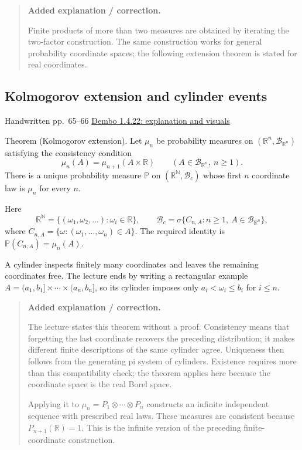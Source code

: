 \documentclass[11pt,letterpaper]{article}
\newcommand{\lecturesection}[1]{\subsection{#1}}
\begin{document}
\begin{quote}\small\textbf{Added explanation / correction.}

Finite products of more than two measures are obtained by iterating the two-factor construction. The same construction works for general probability coordinate spaces; the following extension theorem is stated for real coordinates.
\end{quote}

\hypertarget{l7-s13}{}
\lecturesection{Kolmogorov extension and cylinder events}
{\small\textcolor{lectureink}{Handwritten pp.\ 65--66} \quad \href{https://josephrbailey.com/probability/\#entry-1-4-22}{Dembo 1.4.22: explanation and visuals}}

Theorem (Kolmogorov extension). Let $\mu_n$ be probability measures on $(\mathbb R^n,\mathcal B_{\mathbb R^n})$ satisfying the consistency condition \[\mu_n(A)=\mu_{n+1}(A\times\mathbb R)\qquad(A\in\mathcal B_{\mathbb R^n},\ n\ge1).\] There is a unique probability measure $\mathbb P$ on $(\mathbb R^{\mathbb N},\mathcal B_c)$ whose first $n$ coordinate law is $\mu_n$ for every $n$.

Here \[\mathbb R^{\mathbb N}=\{(\omega_1,\omega_2,\ldots):\omega_i\in\mathbb R\},\qquad\mathcal B_c=\sigma\{C_{n,A}:n\ge1,\ A\in\mathcal B_{\mathbb R^n}\},\] where $C_{n,A}=\{\omega:(\omega_1,\ldots,\omega_n)\in A\}$. The required identity is $\mathbb P(C_{n,A})=\mu_n(A)$.

A cylinder inspects finitely many coordinates and leaves the remaining coordinates free. The lecture ends by writing a rectangular example $A=(a_1,b_1]\times\cdots\times(a_n,b_n]$, so its cylinder imposes only $a_i<\omega_i\le b_i$ for $i\le n$.

\begin{quote}\small\textbf{Added explanation / correction.}

The lecture states this theorem without a proof. Consistency means that forgetting the last coordinate recovers the preceding distribution; it makes different finite descriptions of the same cylinder agree. Uniqueness then follows from the generating pi system of cylinders. Existence requires more than this compatibility check; the theorem applies here because the coordinate space is the real Borel space.

Applying it to $\mu_n=P_1\otimes\cdots\otimes P_n$ constructs an infinite independent sequence with prescribed real laws. These measures are consistent because $P_{n+1}(\mathbb R)=1$. This is the infinite version of the preceding finite-coordinate construction.
\end{quote}
\end{document}

